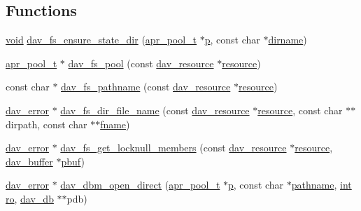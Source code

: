 \subsection*{Functions}
\begin{DoxyCompactItemize}
\item 
\hyperlink{group__MOD__ISAPI_gacd6cdbf73df3d9eed42fa493d9b621a6}{void} \hyperlink{group__MOD__DAV_ga043b66a8072e057f9aa2cc06549beccd}{dav\+\_\+fs\+\_\+ensure\+\_\+state\+\_\+dir} (\hyperlink{structapr__pool__t}{apr\+\_\+pool\+\_\+t} $\ast$\hyperlink{group__APACHE__CORE__MPM_ga5cd91701e5c167f2b1a38e70ab57817e}{p}, const char $\ast$\hyperlink{group__apr__dir_gab8a2fd169b20f0b9d33959f7b17d35aa}{dirname})
\item 
\hyperlink{structapr__pool__t}{apr\+\_\+pool\+\_\+t} $\ast$ \hyperlink{group__MOD__DAV_gabd6b3494f4de797c23cadea279f8a2b2}{dav\+\_\+fs\+\_\+pool} (const \hyperlink{structdav__resource}{dav\+\_\+resource} $\ast$\hyperlink{group__APR__Util__RL_gaa6244aacafcc4ec1d0727bdb32614b11}{resource})
\item 
const char $\ast$ \hyperlink{group__MOD__DAV_gac5e1f3c1ce81f4e7e173219f27a2708d}{dav\+\_\+fs\+\_\+pathname} (const \hyperlink{structdav__resource}{dav\+\_\+resource} $\ast$\hyperlink{group__APR__Util__RL_gaa6244aacafcc4ec1d0727bdb32614b11}{resource})
\item 
\hyperlink{structdav__error}{dav\+\_\+error} $\ast$ \hyperlink{group__MOD__DAV_gae96904b2aaf9fa143f7458db22e61e77}{dav\+\_\+fs\+\_\+dir\+\_\+file\+\_\+name} (const \hyperlink{structdav__resource}{dav\+\_\+resource} $\ast$\hyperlink{group__APR__Util__RL_gaa6244aacafcc4ec1d0727bdb32614b11}{resource}, const char $\ast$$\ast$dirpath, const char $\ast$$\ast$\hyperlink{group__apr__proc__mutex_ga6a2fc0c236288b07ce5bd1335ca89fa2}{fname})
\item 
\hyperlink{structdav__error}{dav\+\_\+error} $\ast$ \hyperlink{group__MOD__DAV_ga7346faebb4629b842fe663bf125b683b}{dav\+\_\+fs\+\_\+get\+\_\+locknull\+\_\+members} (const \hyperlink{structdav__resource}{dav\+\_\+resource} $\ast$\hyperlink{group__APR__Util__RL_gaa6244aacafcc4ec1d0727bdb32614b11}{resource}, \hyperlink{structdav__buffer}{dav\+\_\+buffer} $\ast$\hyperlink{group__APR__Util__XML_gac9cc4f26128efe6579d2643f05554964}{pbuf})
\item 
\hyperlink{structdav__error}{dav\+\_\+error} $\ast$ \hyperlink{group__MOD__DAV_gad4cb194ad9a9407ec27942bd56c82638}{dav\+\_\+dbm\+\_\+open\+\_\+direct} (\hyperlink{structapr__pool__t}{apr\+\_\+pool\+\_\+t} $\ast$\hyperlink{group__APACHE__CORE__MPM_ga5cd91701e5c167f2b1a38e70ab57817e}{p}, const char $\ast$\hyperlink{group__APR__Util__DBM_gaf694cab4f4f6cd4b594af3c43cef1d0a}{pathname}, \hyperlink{pcre_8txt_a42dfa4ff673c82d8efe7144098fbc198}{int} \hyperlink{group__MOD__DAV_ga82a842d0e207f481db3ebda5e61c7135}{ro}, \hyperlink{structdav__db}{dav\+\_\+db} $\ast$$\ast$pdb)
$$
\end{DoxyCompactItemize}
